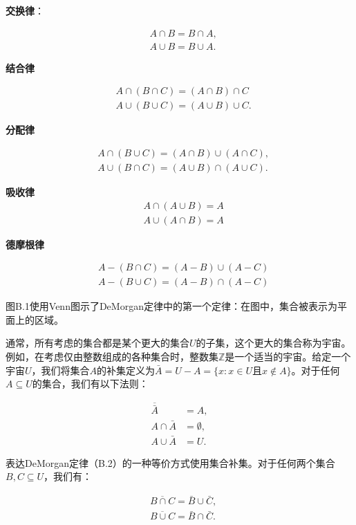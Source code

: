 \documentclass[lang=cn,newtx,10pt,scheme=chinese]{elegantbook}
\begin{document}
\textbf{交换律}：

$$
\begin{aligned}
& A \cap B=B \cap A, \\
& A \cup B=B \cup A .
\end{aligned}
$$

\textbf{结合律}

$$
\begin{aligned}
& A \cap(B \cap C)=(A \cap B) \cap C \\
& A \cup(B \cup C)=(A \cup B) \cup C .
\end{aligned}
$$

\textbf{分配律}

$$
\begin{aligned}
& A \cap(B \cup C)=(A \cap B) \cup(A \cap C), \\
& A \cup(B \cap C)=(A \cup B) \cap(A \cup C) .
\end{aligned}
$$

\textbf{吸收律}
$$
\begin{aligned}
& A \cap(A \cup B)=A \\
& A \cup(A \cap B)=A
\end{aligned}
$$

\textbf{德摩根律}

$$
\begin{aligned}
& A-(B \cap C)=(A-B) \cup(A-C) \\
& A-(B \cup C)=(A-B) \cap(A-C)
\end{aligned}
$$

图B.1使用Venn图示了DeMorgan定律中的第一个定律：在图中，集合被表示为平面上的区域。

通常，所有考虑的集合都是某个更大的集合$U$的子集，这个更大的集合称为宇宙。例如，在考虑仅由整数组成的各种集合时，整数集$\mathbb{Z}$是一个适当的宇宙。给定一个宇宙$U$，我们将集合$A$的补集定义为$\bar{A}=U-A=\{x: x \in U$且$x \notin A\}$。对于任何$A \subseteq U$的集合，我们有以下法则：

$$
\begin{aligned}
\overline{\bar{A}} & =A, \\
A \cap \bar{A} & =\emptyset, \\
A \cup \bar{A} & =U .
\end{aligned}
$$

表达DeMorgan定律（B.2）的一种等价方式使用集合补集。对于任何两个集合$B, C \subseteq U$，我们有：

$$
\begin{aligned}
& \overline{B \cap C}=\bar{B} \cup \bar{C}, \\
& \overline{B \cup C}=\bar{B} \cap \bar{C} .
\end{aligned}
$$
\end{document}
